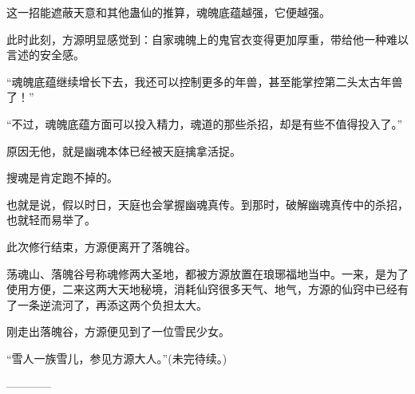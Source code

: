 \begin{this_body}
这一招能遮蔽天意和其他蛊仙的推算，魂魄底蕴越强，它便越强。

此时此刻，方源明显感觉到：自家魂魄上的鬼官衣变得更加厚重，带给他一种难以言述的安全感。

“魂魄底蕴继续增长下去，我还可以控制更多的年兽，甚至能掌控第二头太古年兽了！”

“不过，魂魄底蕴方面可以投入精力，魂道的那些杀招，却是有些不值得投入了。”

原因无他，就是幽魂本体已经被天庭擒拿活捉。

搜魂是肯定跑不掉的。

也就是说，假以时日，天庭也会掌握幽魂真传。到那时，破解幽魂真传中的杀招，也就轻而易举了。

此次修行结束，方源便离开了落魄谷。

荡魂山、落魄谷号称魂修两大圣地，都被方源放置在琅琊福地当中。一来，是为了使用方便，二来这两大天地秘境，消耗仙窍很多天气、地气，方源的仙窍中已经有了一条逆流河了，再添这两个负担太大。

刚走出落魄谷，方源便见到了一位雪民少女。

“雪人一族雪儿，参见方源大人。”(未完待续。)

------------

\end{this_body}

